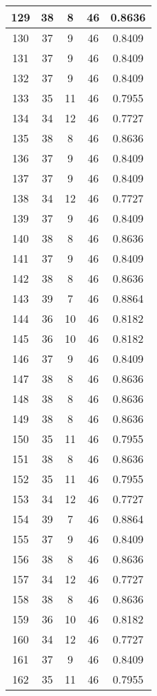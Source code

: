 \documentclass[letterpaper, 12pt]{article}
\begin{document}
\begin{longtable}{|c|c|c|c|c|}
\hline
129 & 38 & 8 & 46 & 0.8636 \\
\hline
130 & 37 & 9 & 46 & 0.8409 \\
\hline
131 & 37 & 9 & 46 & 0.8409 \\
\hline
132 & 37 & 9 & 46 & 0.8409 \\
\hline
133 & 35 & 11 & 46 & 0.7955 \\
\hline
134 & 34 & 12 & 46 & 0.7727 \\
\hline
135 & 38 & 8 & 46 & 0.8636 \\
\hline
136 & 37 & 9 & 46 & 0.8409 \\
\hline
137 & 37 & 9 & 46 & 0.8409 \\
\hline
138 & 34 & 12 & 46 & 0.7727 \\
\hline
139 & 37 & 9 & 46 & 0.8409 \\
\hline
140 & 38 & 8 & 46 & 0.8636 \\
\hline
141 & 37 & 9 & 46 & 0.8409 \\
\hline
142 & 38 & 8 & 46 & 0.8636 \\
\hline
143 & 39 & 7 & 46 & 0.8864 \\
\hline
144 & 36 & 10 & 46 & 0.8182 \\
\hline
145 & 36 & 10 & 46 & 0.8182 \\
\hline
146 & 37 & 9 & 46 & 0.8409 \\
\hline
147 & 38 & 8 & 46 & 0.8636 \\
\hline
148 & 38 & 8 & 46 & 0.8636 \\
\hline
149 & 38 & 8 & 46 & 0.8636 \\
\hline
150 & 35 & 11 & 46 & 0.7955 \\
\hline
151 & 38 & 8 & 46 & 0.8636 \\
\hline
152 & 35 & 11 & 46 & 0.7955 \\
\hline
153 & 34 & 12 & 46 & 0.7727 \\
\hline
154 & 39 & 7 & 46 & 0.8864 \\
\hline
155 & 37 & 9 & 46 & 0.8409 \\
\hline
156 & 38 & 8 & 46 & 0.8636 \\
\hline
157 & 34 & 12 & 46 & 0.7727 \\
\hline
158 & 38 & 8 & 46 & 0.8636 \\
\hline
159 & 36 & 10 & 46 & 0.8182 \\
\hline
160 & 34 & 12 & 46 & 0.7727 \\
\hline
161 & 37 & 9 & 46 & 0.8409 \\
\hline
162 & 35 & 11 & 46 & 0.7955 \\

\end{longtable}
\end{document}
